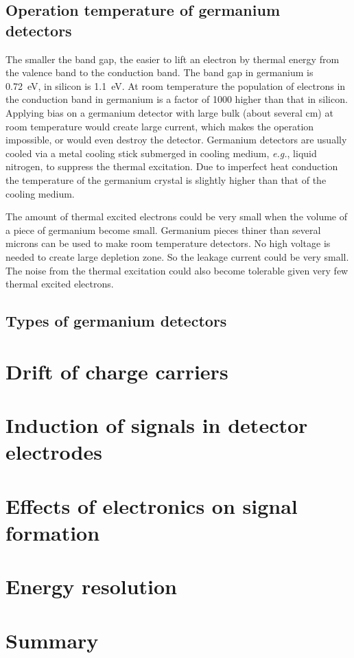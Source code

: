 \subsection{Operation temperature of germanium detectors}
\label{sec:det:temp}
The smaller the band gap, the easier to lift an electron by thermal energy from the valence band to the conduction band. The band gap in germanium is 0.72~eV, in silicon is 1.1~eV. At room temperature the population of electrons in the conduction band in germanium is a factor of 1000 higher than that in silicon. Applying bias on a germanium detector with large bulk (about several cm) at room temperature would create large current, which makes the operation impossible, or would even destroy the detector. Germanium detectors are usually cooled via a metal cooling stick submerged in cooling medium, \textit{e.g.}, liquid nitrogen, to suppress the thermal excitation. Due to imperfect heat conduction the temperature of the germanium crystal is slightly higher than that of the cooling medium.

The amount of thermal excited electrons could be very small when the volume of a piece of germanium become small. Germanium pieces thiner than several microns can be used to make room temperature detectors. No high voltage is needed to create large depletion zone. So the leakage current could be very small. The noise from the thermal excitation could also become tolerable given very few thermal excited electrons.

\subsection{Types of germanium detectors}
\label{sec:det:type}


\section{Drift of charge carriers}
\label{sec:det:drift}

\section{Induction of signals in detector electrodes}
\label{sec:det:lamo}

\section{Effects of electronics on signal formation}
\label{sec:det:elec}

\section{Energy resolution}
\label{sec:det:temp}

\section{Summary}
\label{sec:det:sum}



